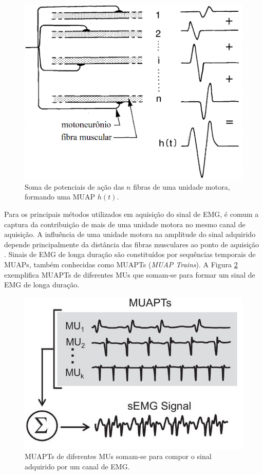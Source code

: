 \begin{figure}[htb]
	\caption{\label{fig_MUAP_comp}Soma de potenciais de ação das $n$ fibras de uma unidade motora, formando uma MUAP $h(t)$.}
	\begin{center}
	    \includegraphics[width=0.75\linewidth]{./img/MUAP_oneMU.png}
	\end{center}
\end{figure}

Para os principais métodos utilizados em aquisição do sinal de EMG, é comum a captura da contribuição de mais de uma unidade motora no mesmo canal de aquisição. A influência de uma unidade motora na amplitude do sinal adquirido depende principalmente da distância das fibras musculares ao ponto de aquisição \cite{Gerdle1999}. Sinais de EMG de longa duração são constituídos por sequências temporais de MUAPs, também conhecidas como MUAPTs (\emph{MUAP Trains}). A Figura \ref{fig_MUAP_trains} exemplifica MUAPTs de diferentes MUs que somam-se para formar um sinal de EMG de longa duração.

\begin{figure}[htb]
	\caption{\label{fig_MUAP_trains}MUAPTs de diferentes MUs somam-se para compor o sinal adquirido por um canal de EMG.}
	\begin{center}
	    \includegraphics[width=0.75\linewidth]{./img/MUAP_trains.jpg}
	\end{center}
\end{figure}

